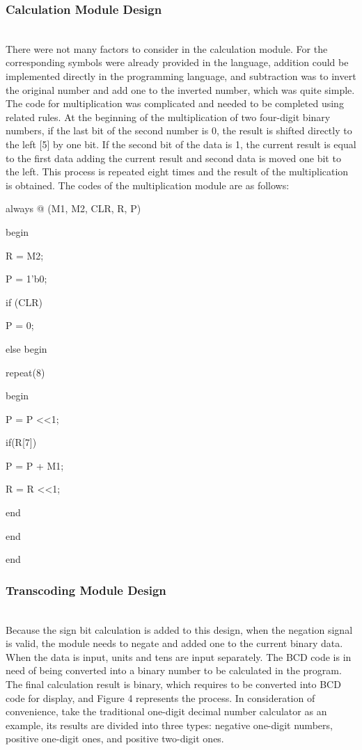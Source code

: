 \documentclass[11pt,journal,compsoc]{IEEEtran}
\begin{document}
\subsubsection{Calculation Module Design}
\hfill\\
There were not many factors to consider in the calculation module. For the corresponding symbols were already provided in the language, addition could be implemented directly in the programming language, and subtraction was to invert the original number and add one to the inverted number, which was quite simple. The code for multiplication was complicated and needed to be completed using related rules. At the beginning of the multiplication of two four-digit binary numbers, if the last bit of the second number is 0, the result is shifted directly to the left [5] by one bit. If the second bit of the data is 1, the current result is equal to the first data adding the current result and second data is moved one bit to the left. This process is repeated eight times and the result of the multiplication is obtained. The codes of the multiplication module are as follows:

always @ (M1, M2, CLR, R, P) 
	
	begin
	
	\qquad R = M2;
	
	\qquad P = 1'b0;
	
	\qquad if (CLR)
	
	\qquad P = 0;
	
	\qquad else begin
	
	\qquad \qquad \qquad repeat(8)
	
	\qquad \qquad  \qquad begin
	
	\qquad \qquad \qquad\qquad  P = P \textless \textless 1; 
	
	\qquad \qquad \qquad \qquad if(R[7])
	
	\qquad \qquad \qquad \qquad P = P + M1; 
	
	\qquad \qquad \qquad \qquad R = R \textless \textless 1;
	
	\qquad \qquad \qquad end
	
	\qquad \qquad end 
	
	end

\subsubsection{Transcoding Module Design}
\hfill\\
Because the sign bit calculation is added to this design, when the negation signal is valid, the module needs to negate and added one to the current binary data. When the data is input, units and tens are input separately. The BCD code is in need of being converted into a binary number to be calculated in the program. The final calculation result is binary, which requires to be converted into BCD code for display, and Figure 4 represents the process. In consideration of convenience, take the traditional one-digit decimal number calculator as an example, its results are divided into three types: negative one-digit numbers, positive one-digit ones, and positive two-digit ones.
\end{document}
